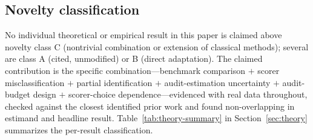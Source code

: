 \subsection{Novelty classification}
\label{sec:appendix-novelty}

No individual theoretical or empirical result in this paper is claimed
above novelty class C (nontrivial combination or extension of classical
methods); several are class A (cited, unmodified) or B (direct adaptation).
The claimed contribution is the specific combination---benchmark comparison
$+$ scorer misclassification $+$ partial identification $+$
audit-estimation uncertainty $+$ audit-budget design $+$ scorer-choice
dependence---evidenced with real data throughout, checked against the
closest identified prior work \citep{chen2026partial} and found
non-overlapping in estimand and headline result. Table~\ref{tab:theory-summary}
in Section~\ref{sec:theory} summarizes the per-result classification.
